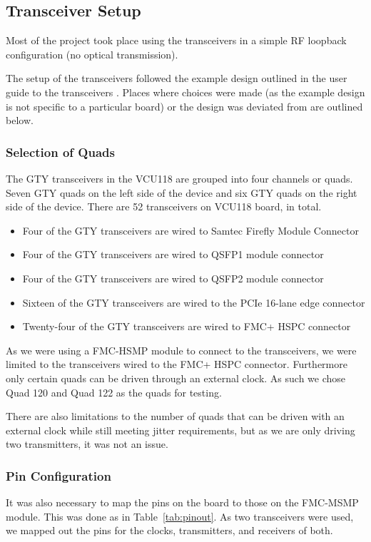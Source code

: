 \begin{figure}[ht]
\end{figure}

\subsection{Transceiver Setup}%
\label{sub:transceiver_setup}
Most of the project took place using the transceivers in a simple RF loopback
configuration (no optical transmission).

The setup of the transceivers followed the example design outlined in the user
guide to the transceivers \cite{wizard_guide}. Places where choices were made
(as the example design is not specific to a particular board) or the
design was deviated from are outlined below. 

\subsubsection{Selection of Quads}%
\label{ssub:selection_of_quads}
The GTY transceivers in the VCU118 are grouped into four channels or quads.
Seven GTY quads on the left side of the device and six GTY quads on the right
side of the device.
There are 52 transceivers on VCU118 board, in total.
\begin{itemize}
    \item Four of the GTY transceivers are wired to Samtec Firefly Module Connector 
    \item Four of the GTY transceivers are wired to QSFP1 module connector 
    \item Four of the GTY transceivers are wired to QSFP2 module connector 
    \item Sixteen of the GTY transceivers are wired to the PCIe 16-lane edge connector
    \item Twenty-four of the GTY transceivers are wired to FMC+ HSPC connector
\end{itemize}

As we were using a FMC-HSMP module to connect to the transceivers, we were limited to the transceivers wired
to the FMC+ HSPC connector.
Furthermore only certain quads can be driven through an external clock.
As such we chose Quad 120 and Quad 122 as the quads for testing.

There are also limitations to the number of quads that can be driven with an
external clock while still meeting jitter requirements, but as we are only
driving two transmitters, it was not an issue.



\subsubsection{Pin Configuration}%
\label{ssub:pin_configuration}
It was also necessary to map the pins on the board to those on
the FMC-MSMP module. This was done as in Table~\ref{tab:pinout}.
As two transceivers were used, we mapped out the pins for the clocks, transmitters,
and receivers of both.

